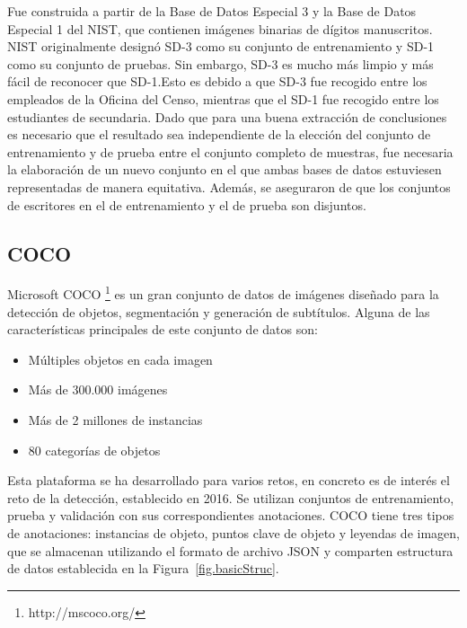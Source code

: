 Fue construida a partir de la Base de Datos Especial 3 y la Base de Datos Especial 1 del NIST, que contienen imágenes binarias de dígitos manuscritos. NIST originalmente designó SD-3 como su conjunto de entrenamiento y SD-1 como su conjunto de pruebas. Sin embargo, SD-3 es mucho más limpio y más fácil de reconocer que SD-1.Esto es debido a que SD-3 fue recogido entre los empleados de la Oficina del Censo, mientras que el SD-1 fue recogido entre los estudiantes de secundaria. Dado que para una buena extracción de conclusiones es necesario que el resultado sea independiente de la elección del conjunto de entrenamiento y de prueba entre el conjunto completo de muestras, fue necesaria la elaboración de un nuevo conjunto en el que ambas bases de datos estuviesen representadas de manera equitativa. Además, se aseguraron de que los conjuntos de escritores en el de entrenamiento y el de prueba son disjuntos.

\subsection{COCO}
Microsoft COCO \footnote{http://mscoco.org/} es un gran conjunto de datos de imágenes diseñado para la detección de objetos, segmentación y generación de subtítulos\cite{veit2016cocotext}. Alguna de las características principales de este conjunto de datos son:
	\begin{itemize}
         \item Múltiples objetos en cada imagen
     	 \item Más de 300.000 imágenes
         \item Más de 2 millones de instancias
         \item 80 categorías de objetos
    \end{itemize}
    
Esta plataforma se ha desarrollado para varios retos, en concreto es de interés el reto de la detección, establecido en 2016. Se utilizan conjuntos de entrenamiento, prueba y validación con sus correspondientes anotaciones. COCO tiene tres tipos de anotaciones: instancias de objeto, puntos clave de objeto y leyendas de imagen, que se almacenan utilizando el formato de archivo JSON y comparten estructura de datos establecida en la Figura~\ref{fig.basicStruc}. \\

